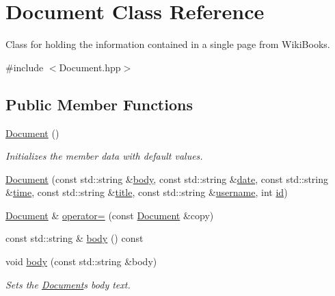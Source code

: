 \hypertarget{class_document}{}\section{Document Class Reference}
\label{class_document}


Class for holding the information contained in a single page from Wiki\+Books.  




{\ttfamily \#include $<$Document.\+hpp$>$}

\subsection*{Public Member Functions}
\begin{DoxyCompactItemize}
\item 
\hyperlink{class_document_acdbcbe550084e8c20f4f67eb229ad66a}{Document} ()
\begin{DoxyCompactList}\small\item\em Initializes the member data with default values. \end{DoxyCompactList}\item 
\hyperlink{class_document_a37880d88667c09cc39ef46937f2cf6e4}{Document} (const std\+::string \&\hyperlink{class_document_a878497826a1ca34e778ef05f1a809d1a}{body}, const std\+::string \&\hyperlink{class_document_a1185d78c1c5c5ea69572c20d1c8e552a}{date}, const std\+::string \&\hyperlink{class_document_afda77c47efd90655ba5bb2ab8bf9ba00}{time}, const std\+::string \&\hyperlink{class_document_a4aac8266d0fea88e39ee390159130787}{title}, const std\+::string \&\hyperlink{class_document_a52990ba26536e2e3a08593444e0ccdf3}{username}, int \hyperlink{class_document_acda3a6caa3bc958024aa795cde6c7081}{id})
\item 
\hyperlink{class_document}{Document} \& \hyperlink{class_document_ad90511280d1b3815e57ed78003002ea1}{operator=} (const \hyperlink{class_document}{Document} \&copy)
\item 
const std\+::string \& \hyperlink{class_document_a878497826a1ca34e778ef05f1a809d1a}{body} () const 
\item 
void \hyperlink{class_document_a239171caccf983622b557898846c46e5}{body} (const std\+::string \&body)
\begin{DoxyCompactList}\small\item\em Sets the \hyperlink{class_document}{Document}\textquotesingle{}s body text. \end{DoxyCompactList}\item 

\end{DoxyCompactItemize}
